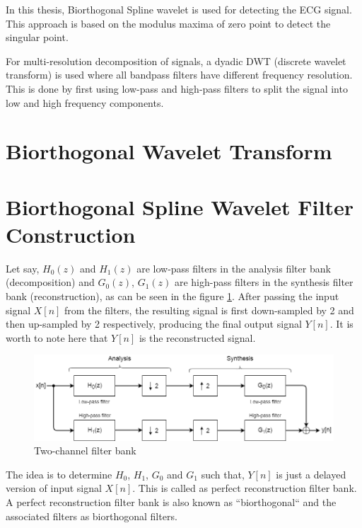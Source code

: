In this thesis, Biorthogonal Spline wavelet is used for detecting the ECG signal. This approach is based on the modulus maxima of zero point to detect the singular point. 


For multi-resolution decomposition of signals, a dyadic DWT (discrete wavelet transform) is used where all bandpass filters have different frequency resolution. This is done by first using low-pass and high-pass filters to split the signal into low and high frequency components.
\section{Biorthogonal Wavelet Transform}


\section{Biorthogonal Spline Wavelet Filter Construction}
 Let say, ${H_{0}(z)}$ and ${H_{1}(z)}$ are low-pass filters in the analysis filter bank (decomposition) and ${G_{0}(z)}$, ${G_{1}(z)}$ are high-pass filters in the synthesis filter bank (reconstruction), as can be seen in the figure \ref{fig:2_channel_filter_bank}. After passing the input signal $X[n]$ from the filters, the resulting signal is first down-sampled by 2 and then up-sampled by 2  respectively, producing the final output signal $Y[n]$. It is worth to note here that $Y[n]$ is the reconstructed signal. 
 
 
 
 \begin{figure}
 	\centering
 	\includegraphics[width=160mm]{images/2_channel_filter_bank}
 	\caption{Two-channel filter bank}
 	\label{fig:2_channel_filter_bank}
 \end{figure}
 
 
 
 The idea is to determine $H_0$, $H_1$, $G_0$ and $G_1$ such that, $Y[n]$ is just a delayed version of input signal $X[n]$. This is called as perfect reconstruction filter bank. A perfect reconstruction filter bank is also known as ``biorthogonal`` and the associated filters as biorthogonal filters. 

